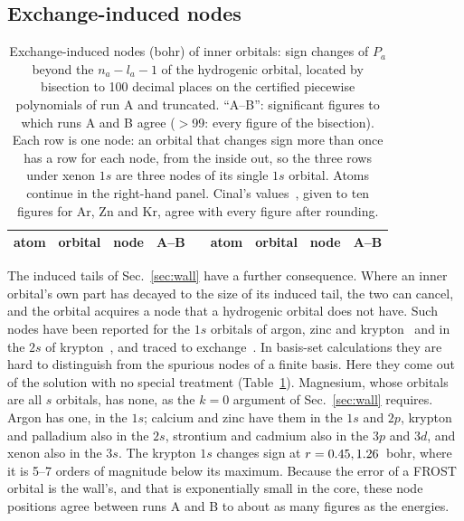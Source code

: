 \documentclass[aps,pra,reprint,superscriptaddress,amsmath,amssymb,longbibliography]{revtex4-2}
\begin{document}
\subsection{Exchange-induced nodes}\label{sec:nodes}

\begin{table}[t]
\caption{Exchange-induced nodes (bohr) of inner orbitals: sign changes of $P_a$ beyond the $n_a-l_a-1$ of the hydrogenic orbital, located by bisection to 100 decimal places on the certified piecewise polynomials of run A and truncated. ``A--B'': significant figures to which runs A and B agree ($>$99: every figure of the bisection). Each row is one node: an orbital that changes sign more than once has a row for each node, from the inside out, so the three rows under xenon $1s$ are three nodes of its single $1s$ orbital. Atoms continue in the right-hand panel. Cinal's values~\cite{Cinal2020}, given to ten figures for Ar, Zn and Kr, agree with every figure after rounding.}
\label{tab:nodes}
\footnotesize
\begin{ruledtabular}
\begin{tabular}{llllcllll}
atom & orbital & node & A--B & & atom & orbital & node & A--B \\
\hline

\end{tabular}
\end{ruledtabular}
\end{table}

The induced tails of Sec.~\ref{sec:wall} have a further consequence. Where an inner orbital's own part has decayed to the size of its induced tail, the two can cancel, and the orbital acquires a node that a hydrogenic orbital does not have. Such nodes have been reported for the $1s$ orbitals of argon, zinc and krypton~\cite{Takeda2014,Cinal2020} and in the $2s$ of krypton~\cite{Mendez2016,Cinal2020}, and traced to exchange~\cite{Hatano2021}. In basis-set calculations they are hard to distinguish from the spurious nodes of a finite basis. Here they come out of the solution with no special treatment (Table~\ref{tab:nodes}). Magnesium, whose orbitals are all $s$ orbitals, has none, as the $k=0$ argument of Sec.~\ref{sec:wall} requires. Argon has one, in the $1s$; calcium and zinc have them in the $1s$ and $2p$, krypton and palladium also in the $2s$, strontium and cadmium also in the $3p$ and $3d$, and xenon also in the $3s$. The krypton $1s$ changes sign at $r=0.45, 1.26$~bohr, where it is 5--7 orders of magnitude below its maximum. Because the error of a FROST orbital is the wall's, and that is exponentially small in the core, these node positions agree between runs A and B to about as many figures as the energies.
\end{document}

